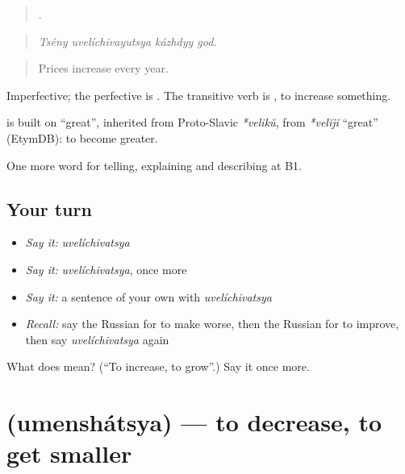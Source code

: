 \begin{quote}
   .
\end{quote}

\begin{quote}
\emph{Tsény uvelíchivayutsya kázhdyy god.}
\end{quote}

\begin{quote}
Prices increase every year.
\end{quote}

Imperfective; the perfective is \emph{}. The transitive verb is \emph{}, to increase something.

\begin{cousinweb}
\textbf{} is built on \emph{} \textquotedblleft{}great\textquotedblright{}, inherited from Proto-Slavic \emph{*velikŭ}, from \emph{*velĭjĭ} \textquotedblleft{}great\textquotedblright{} (EtymDB): to become greater.
\end{cousinweb}

\begin{grammarlens}[title={What you've built}]
One more word for telling, explaining and describing at B1.
\end{grammarlens}

\subsection*{Your turn}
\begin{itemize}
\raggedright
  \item \emph{Say it:} \emph{uvelíchivatsya}
  \item \emph{Say it:} \emph{uvelíchivatsya}, once more
  \item \emph{Say it:} a sentence of your own with \emph{uvelíchivatsya}
  \item \emph{Recall:} say the Russian for to make worse, then the Russian for to improve, then say \emph{uvelíchivatsya} again
\end{itemize}

\begin{tcolorbox}[breakable,colback=teal!4,colframe=teal!35!black,title={Before you move on}]
What does  mean? (\textquotedblleft{}To increase, to grow\textquotedblright{}.) Say it once more.
\end{tcolorbox}
\section[\texorpdfstring{\ru{уменьшаться} (umenshátsya)}{уменьшаться (umenshátsya)}]{ (umenshátsya) — to decrease, to get smaller}

